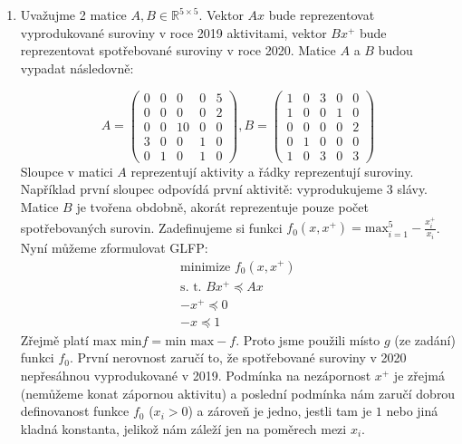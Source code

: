 \documentclass[12pt, a4paper]{article}
\begin{document}
\section{}
\begin{enumerate}[label=\alph*)]
\item Uvažujme 2 matice $A,B \in \mathbb{R}^{5 \times 5}$. Vektor $Ax$ bude reprezentovat vyprodukované suroviny v roce 2019 aktivitami, vektor $Bx^{+}$ bude reprezentovat spotřebované suroviny v roce 2020. Matice $A$ a $B$ budou vypadat následovně:
\iffalse
\[
A = \begin{pmatrix}
-1 & 0 & -3 & 0 & 5\\
-1 & 0 & 0 & -1 & 2\\
0 & 0 & 10 & 0 & -2\\
3 & -1 & 0 & 1 & 0\\
-1 & 1 & -3 & 1 & -3
\end{pmatrix},
B = \begin{pmatrix}
1 & 0 & 3 & 0 & 0\\
1 & 0 & 0 & 1 & 0\\
0 & 0 & 0 & 0 & 2\\
0 & 1 & 0 & 0 & 0\\
1 & 0 & 3 & 0 & 3 
\end{pmatrix}
\]
\fi 
\[
A = \begin{pmatrix}
0 & 0 & 0 & 0 & 5\\
0 & 0 & 0 & 0 & 2\\
0 & 0 & 10 & 0 & 0\\
3 & 0 & 0 & 1 & 0\\
0 & 1 & 0 & 1 & 0
\end{pmatrix},
B = \begin{pmatrix}
1 & 0 & 3 & 0 & 0\\
1 & 0 & 0 & 1 & 0\\
0 & 0 & 0 & 0 & 2\\
0 & 1 & 0 & 0 & 0\\
1 & 0 & 3 & 0 & 3 
\end{pmatrix}
\]
Sloupce v matici $A$ reprezentují aktivity a řádky reprezentují suroviny. Například první sloupec odpovídá první aktivitě: vyprodukujeme 3 slávy. Matice $B$ je tvořena obdobně, akorát reprezentuje pouze počet spotřebovaných surovin. Zadefinujeme si funkci $f_0(x,x^{+}) = \text{max}_{i=1}^5 -\frac{x_i^{+}}{x_i}$. Nyní můžeme zformulovat GLFP:
\begin{gather*}
\text{minimize } f_0(x,x^{+})\\
\text{s. t. } Bx^{+} \preceq Ax\\
-x^{+} \preceq 0\\
-x \preceq 1 
\end{gather*}
Zřejmě platí $\text{max min} f = \text{min max} -f$. Proto jsme použili místo $g$ (ze zadání) funkci $f_0$. První nerovnost zaručí to, že spotřebované suroviny v 2020 nepřesáhnou vyprodukované v 2019. Podmínka na nezápornost $x^+$ je zřejmá (nemůžeme konat zápornou aktivitu) a poslední podmínka nám zaručí dobrou definovanost funkce $f_0$ ($x_i > 0$) a zároveň je jedno, jestli tam je $1$ nebo jiná kladná konstanta, jelikož nám záleží jen na poměrech mezi $x_i$.


\end{enumerate}
\end{document}
